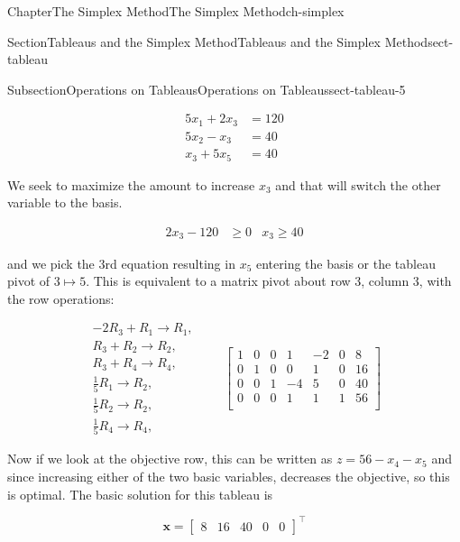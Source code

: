 \documentclass[oneside,10pt,]{book}
\numberwithin{equation}{section}
\newcommand{\amp}{&}
\begin{document}
\begin{chapterptx}{Chapter}{The Simplex Method}{}{The Simplex Method}{}{}{ch-simplex}
\begin{sectionptx}{Section}{Tableaus and the Simplex Method}{}{Tableaus and the Simplex Method}{}{}{sect-tableau}
\begin{subsectionptx}{Subsection}{Operations on Tableaus}{}{Operations on Tableaus}{}{}{sect-tableau-5}
\par
%
\begin{align*}
5x_1 + 2x_3 \amp = 120\\
5x_2 - x_3 \amp = 40\\
x_3 + 5x_5 \amp =40
\end{align*}
%
\par
We seek to maximize the amount to increase \(x_3\) and that will switch the other variable to the basis.%
\par
%
\begin{align*}
2x_3-120 \amp \geq 0 \amp x_3 \geq 40
\end{align*}
%
\par
and we pick the 3rd equation resulting in \(x_5\) entering the basis or the tableau pivot of \(3 \mapsto 5\). This is equivalent to a matrix pivot about row 3, column 3, with the row operations:%
\par
%
\begin{equation}
\begin{array}{r} -2R_3 + R_1  \to R_1, \\ R_3 + R_2  \to R_2,  \\ R_3 + R_4  \to R_4, \\ \frac{1}{5} R_1  \to R_2, \\ \frac{1}{5} R_2  \to R_2, \\ \frac{1}{5} R_4 \to R_4, \end{array} \qquad \left[\begin{array}{rr|rrrr|r} 1 \amp 0 \amp 0 \amp 1 \amp -2 \amp 0 \amp 8\\ 0 \amp 1 \amp 0 \amp 0 \amp 1 \amp 0 \amp 16\\ 0 \amp 0 \amp 1 \amp -4 \amp 5 \amp 0 \amp 40\\ \hline 0 \amp 0 \amp 0 \amp 1 \amp 1 \amp 1 \amp 56\\ \end{array} \right]\label{eq-tableau-LOP1-step4}
\end{equation}
%
\par
Now if we look at the objective row, this can be written as \(z = 56 - x_4 - x_5\) and since increasing either of the two basic variables, decreases the objective, so this is optimal. The basic solution for this tableau is%
\par
%
\begin{equation*}
\boldsymbol{x} = \left[\begin{array}{cc|ccc} 8 \amp 16 \amp 40 \amp 0 \amp 0 \end{array}\right]^{\intercal}

\end{equation*}
\end{subsectionptx}
\end{sectionptx}
\end{chapterptx}
\end{document}
